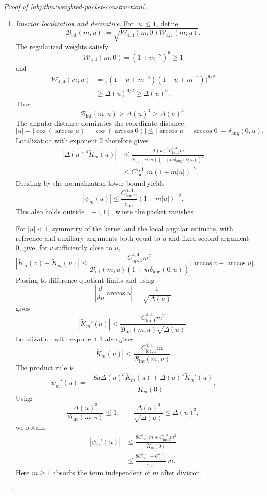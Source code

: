 \documentclass[11pt]{article}
\begin{document}
\begin{proof}[Proof of \cref{obj:thm:weighted-packet-construction}]
\begin{enumerate}
\item \emph{Interior localization and derivative.}
For \(|u|\le1\), define
\[
\mathcal B_{\mathrm{int}}(m,u)
:=
\sqrt{\mathcal W_{4,4}(m;0)\mathcal W_{4,4}(m;u)}.
\]
The regularized weights satisfy
\[
\mathcal W_{4,4}(m;0)=(1+m^{-2})^9\ge1
\]
and
\[
\begin{split}
\mathcal W_{4,4}(m;u)
&=\bigl((1-u+m^{-2})(1+u+m^{-2})\bigr)^{9/2}\\
&\ge\Delta(u)^{9/2}\ge\Delta(u)^6.
\end{split}
\]
Thus
\[
\mathcal B_{\mathrm{int}}(m,u)\ge\Delta(u)^3\ge\Delta(u)^4.
\]
The angular distance dominates the coordinate distance:
\[
|u|
=
|\cos(\arccos u)-\cos(\arccos0)|
\le|\arccos u-\arccos0|
=
\delta_{\mathrm{ang}}(0,u).
\]
Localization with exponent \(2\) therefore gives
\[
\begin{split}
|\Delta(u)^4\widetilde K_m(u)|
&\le
\frac{\Delta(u)^4C_{\mathrm{loc},2}^{4,4}m}
{\mathcal B_{\mathrm{int}}(m,u)
 (1+m\delta_{\mathrm{ang}}(0,u))^2}\\
&\le C_{\mathrm{loc},2}^{4,4}m(1+m|u|)^{-2}.
\end{split}
\]
Dividing by the normalization lower bound yields
\[
|\psi_m(u)|
\le
\frac{C_{\mathrm{loc},2}^{4,4}}{c_{\mathrm{int}}}
(1+m|u|)^{-2}.
\]
This also holds outside \([-1,1]\), where the packet vanishes.

For \(|u|<1\), symmetry of the kernel and the local angular estimate, with reference and auxiliary arguments both equal to \(u\) and fixed second argument \(0\), give, for \(v\) sufficiently close to \(u\),
\[
|\widetilde K_m(v)-\widetilde K_m(u)|
\le
\frac{C_{\mathrm{lip},1}^{4,4}m^2}
{\mathcal B_{\mathrm{int}}(m,u)
 (1+m\delta_{\mathrm{ang}}(0,u))}
|\arccos v-\arccos u|.
\]
Passing to difference-quotient limits and using
\[
\left|\frac{d}{du}\arccos u\right|
=\frac1{\sqrt{\Delta(u)}}
\]
gives
\[
|\widetilde K_m'(u)|
\le
\frac{C_{\mathrm{lip},1}^{4,4}m^2}
{\mathcal B_{\mathrm{int}}(m,u)\sqrt{\Delta(u)}}.
\]
Localization with exponent \(1\) also gives
\[
|\widetilde K_m(u)|
\le
\frac{C_{\mathrm{loc},1}^{4,4}m}
{\mathcal B_{\mathrm{int}}(m,u)}.
\]
The product rule is
\[
\psi_m'(u)
=
\frac{-8u\Delta(u)^3\widetilde K_m(u)
+\Delta(u)^4\widetilde K_m'(u)}
{\widetilde K_m(0)}.
\]
Using
\[
\frac{\Delta(u)^3}{\mathcal B_{\mathrm{int}}(m,u)}\le1,
\qquad
\frac{\Delta(u)^4}{\sqrt{\Delta(u)}}\le\Delta(u)^3,
\]
we obtain
\[
\begin{split}
|\psi_m'(u)|
&\le
\frac{8C_{\mathrm{loc},1}^{4,4}m
      +C_{\mathrm{lip},1}^{4,4}m^2}
     {\widetilde K_m(0)}\\
&\le
\frac{8C_{\mathrm{loc},1}^{4,4}
      +C_{\mathrm{lip},1}^{4,4}}{c_{\mathrm{int}}}\,m.
\end{split}
\]
Here \(m\ge1\) absorbs the term independent of \(m\) after division.


\end{enumerate}
\end{proof}
\end{document}
